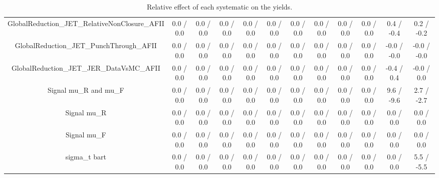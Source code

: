 \begin{table}[htbp]
\begin{center}
\begin{tabular}{|c|c|c|c|c|c|c|c|c|c|c|c|}
  GlobalReduction_JET_RelativeNonClosure_AFII & 0.0 / 0.0 & 0.0 / 0.0 & 0.0 / 0.0 & 0.0 / 0.0 & 0.0 / 0.0 & 0.0 / 0.0 & 0.0 / 0.0 & 0.0 / 0.0 & 0.0 / 0.0 & 0.4 / -0.4 & 0.2 / -0.2 \\ 
  GlobalReduction_JET_PunchThrough_AFII & 0.0 / 0.0 & 0.0 / 0.0 & 0.0 / 0.0 & 0.0 / 0.0 & 0.0 / 0.0 & 0.0 / 0.0 & 0.0 / 0.0 & 0.0 / 0.0 & 0.0 / 0.0 & -0.0 / -0.0 & -0.0 / -0.0 \\ 
  GlobalReduction_JET_JER_DataVsMC_AFII & 0.0 / 0.0 & 0.0 / 0.0 & 0.0 / 0.0 & 0.0 / 0.0 & 0.0 / 0.0 & 0.0 / 0.0 & 0.0 / 0.0 & 0.0 / 0.0 & 0.0 / 0.0 & -0.4 / 0.4 & -0.0 / 0.0 \\ 
  Signal  mu_{R} and  mu_{F} & 0.0 / 0.0 & 0.0 / 0.0 & 0.0 / 0.0 & 0.0 / 0.0 & 0.0 / 0.0 & 0.0 / 0.0 & 0.0 / 0.0 & 0.0 / 0.0 & 0.0 / 0.0 & 9.6 / -9.6 & 2.7 / -2.7 \\ 
  Signal  mu_{R} & 0.0 / 0.0 & 0.0 / 0.0 & 0.0 / 0.0 & 0.0 / 0.0 & 0.0 / 0.0 & 0.0 / 0.0 & 0.0 / 0.0 & 0.0 / 0.0 & 0.0 / 0.0 & 0.0 / 0.0 & 0.0 / 0.0 \\ 
  Signal  mu_{F} & 0.0 / 0.0 & 0.0 / 0.0 & 0.0 / 0.0 & 0.0 / 0.0 & 0.0 / 0.0 & 0.0 / 0.0 & 0.0 / 0.0 & 0.0 / 0.0 & 0.0 / 0.0 & 0.0 / 0.0 & 0.0 / 0.0 \\ 
   sigma_{t bar{t}} & 0.0 / 0.0 & 0.0 / 0.0 & 0.0 / 0.0 & 0.0 / 0.0 & 0.0 / 0.0 & 0.0 / 0.0 & 0.0 / 0.0 & 0.0 / 0.0 & 0.0 / 0.0 & 0.0 / 0.0 & 5.5 / -5.5 \\ 
\hline 
\end{tabular} 
\caption{Relative effect of each systematic on the yields.} 
\end{center} 
\end{table} 
